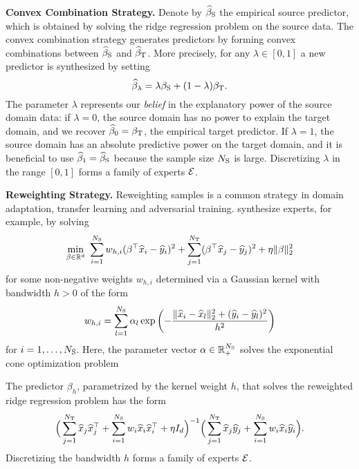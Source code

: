 \documentclass{article}
\begin{document}
\textbf{Convex Combination Strategy. }
Denote by $\widehat \beta_{\rm S}$ the empirical source predictor, which is obtained by solving the ridge regression problem on the source data. The convex combination strategy generates predictors by forming convex combinations between $\widehat \beta_{\rm S}$ and $\widehat \beta_{\rm T}$. More precisely, for any $\lambda \in [0, 1]$ a new predictor is synthesized by setting
\[
    \widehat \beta_\lambda = \lambda \beta_{\rm S} + (1-\lambda) \beta_{\rm T}. 
\]
The parameter $\lambda$ represents our \textit{belief} in the explanatory power of the source domain data: if $\lambda = 0$, the source domain has no power to explain the target domain, and we recover $\widehat \beta_0 = \beta_{\rm T}$, the empirical target predictor. If $\lambda = 1$, the source domain has an absolute predictive power on the target domain, and it is beneficial to use $\widehat \beta_1 = \widehat \beta_{\rm S}$ because the sample size $N_{\rm S}$ is large. Discretizing $\lambda$ in the range $[0, 1]$ forms a family of experts $\mathcal E$.

\textbf{Reweighting Strategy.} Reweighting samples is a common strategy in domain adaptation, transfer learning and adversarial training. \citet{ref:garcke2014importance} synthesize experts, for example, by solving
\[
    \min\limits_{\beta \in \mathbb{R}^d}~  \sum_{i=1}^{N_{\rm S}} w_{h,i} (\beta^\top \widehat x_i -  \widehat y_i)^2 + \sum_{j=1}^{N_{\rm T}} (\beta^\top \widehat x_j -  \widehat y_j)^2 +  \eta \| \beta\|_2^2
\]
for some non-negative weights $w_{h,i}$ determined via a Gaussian kernel with bandwidth $h > 0$ of the form
\[
    w_{h,i} = \sum_{l=1}^{N_{\rm S}} \alpha_l \exp \left( - \frac{\| \widehat x_i - \widehat x_l\|_2^2 + (\widehat y_i - \widehat y_l)^2}{h^2} \right)
\]
for $i = 1, \ldots, N_{\rm S}$. Here, the parameter vector $\alpha \in \mathbb{R}_+^{N_{\rm S}}$ solves the exponential cone optimization problem
\be \notag 
\ee
The predictor $\beta_h$, parametrized by the kernel weight $h$, that solves the reweighted ridge regression problem has the form
\[
 \Big( \sum_{j=1}^{N_{\rm T}} \widehat x_j \widehat x_j^\top + \sum_{i=1}^{N_{\rm S}} w_i \widehat x_i \widehat x_i^\top + \eta I_d \Big)^{-1} \Big( \sum_{j=1}^{N_{\rm T}} \widehat x_j \widehat y_j  + \sum_{i=1}^{N_{\rm S}} w_i \widehat x_i \widehat y_i\Big).
\]
Discretizing the bandwidth $h$ forms a family of experts $\mathcal E$. 
\end{document}
